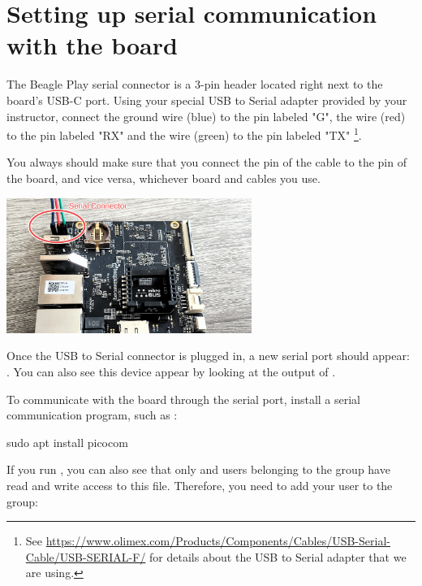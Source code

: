 \section{Setting up serial communication with the board}

The Beagle Play serial connector is a 3-pin header located right next to the
board's USB-C port. Using your special USB to Serial adapter provided  by your
instructor, connect the ground wire (blue) to the pin labeled "G", the
 wire (red) to the pin labeled "RX" and the  wire (green) to
the pin labeled "TX" \footnote{See \url{https://www.olimex.com/Products/Components/Cables/USB-Serial-Cable/USB-SERIAL-F/}
for details about the USB to Serial adapter that we are using.}.

You always should make sure that you connect the  pin of the cable
to the  pin of the board, and vice versa, whichever board and
cables you use.

\begin{center}
\includegraphics[width=8cm]{common/beagleplay-serial-connection.jpg}
\end{center}

Once the USB to Serial connector is plugged in, a new serial port
should appear: .  You can also see this device
appear by looking at the output of .

To communicate with the board through the serial port, install a
serial communication program, such as :

\begin{bashinput}
sudo apt install picocom
\end{bashinput}

If you run , you can also see that only
 and users belonging to the  group have
read and write access to this file. Therefore, you need to add your user
to the  group:


